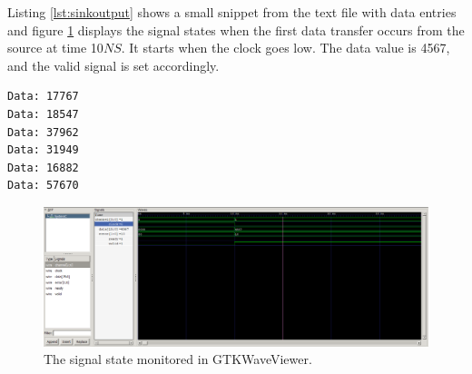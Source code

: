 \noindent Listing \ref{lst:sinkoutput} shows a small snippet from the text file with data entries and figure \ref{fig:gtkwavesignalstate} displays the signal states when the first data transfer occurs from the source at time 10$NS$. It starts when the clock goes low. The data value is 4567, and the valid signal is set accordingly.

\begin{lstlisting}[caption=Output at the sink., frame=single, captionpos=b label={lst:sinkoutput}]
Data: 17767
Data: 18547
Data: 37962
Data: 31949
Data: 16882
Data: 57670
\end{lstlisting}

\begin{figure}[H]
	\centering
	\includegraphics[width=1\linewidth]{MasterSlaveSTGTKWave.png}
	\caption{The signal state monitored in GTKWaveViewer.}
	\label{fig:gtkwavesignalstate}
\end{figure}